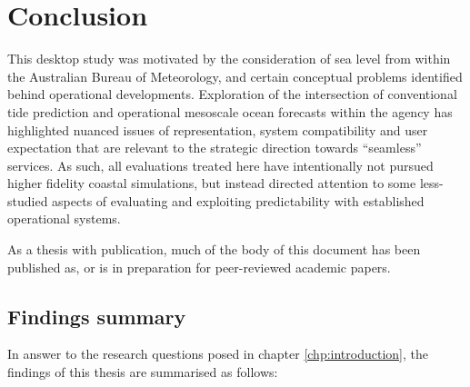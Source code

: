 \chapter{Conclusion}
\label{chp:conclusions}
This desktop study was motivated by the consideration of sea level from within the Australian Bureau of Meteorology, and certain conceptual problems identified behind operational developments.
Exploration of the intersection of conventional tide prediction and operational mesoscale ocean forecasts within the agency has highlighted nuanced issues of representation, system compatibility and user expectation that are relevant to the strategic direction towards ``seamless'' services.
As such, all evaluations treated here have intentionally not pursued higher fidelity coastal simulations, but instead directed attention to some less-studied aspects of evaluating and exploiting predictability with established operational systems.   

As a thesis with publication, much of the body of this document has been published as, or is in preparation for peer-reviewed academic papers.
\section{Findings summary}
In answer to the research questions posed in chapter \ref{chp:introduction},  the findings of this thesis are summarised as follows:\\


